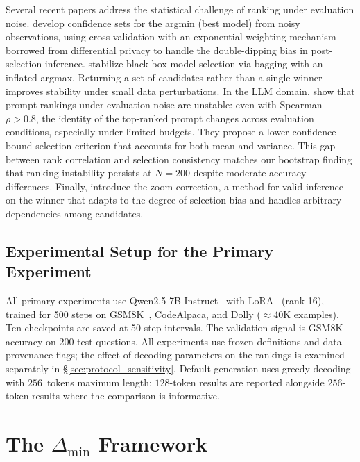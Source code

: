 \documentclass[pdflatex,sn-mathphys-ay,iicol]{sn-jnl}
\theoremstyle{thmstylethree}
\begin{document}
Several recent papers address the statistical challenge of ranking under evaluation noise. \citet{zhang2024winners} develop confidence sets for the argmin (best model) from noisy observations, using cross-validation with an exponential weighting mechanism borrowed from differential privacy to handle the double-dipping bias in post-selection inference. \citet{adrian2024stabilizing} stabilize black-box model selection via bagging with an inflated argmax. Returning a set of candidates rather than a single winner improves stability under small data perturbations. In the LLM domain, \citet{du2026stability} show that prompt rankings under evaluation noise are unstable: even with Spearman $\rho>0.8$, the identity of the top-ranked prompt changes across evaluation conditions, especially under limited budgets. They propose a lower-confidence-bound selection criterion that accounts for both mean and variance. This gap between rank correlation and selection consistency matches our bootstrap finding that ranking instability persists at $N=200$ despite moderate accuracy differences. Finally, \citet{zrnic2024flexible} introduce the zoom correction, a method for valid inference on the winner that adapts to the degree of selection bias and handles arbitrary dependencies among candidates.

\subsection{Experimental Setup for the Primary Experiment}

All primary experiments use Qwen2.5-7B-Instruct~\citep{qwen2024qwen2} with LoRA~\citep{hu2022lora} (rank 16), trained for 500 steps on GSM8K~\citep{cobbe2021gsm8k}, CodeAlpaca, and Dolly ($\approx$40K examples). Ten checkpoints are saved at 50-step intervals. The validation signal is GSM8K accuracy on 200 test questions. All experiments use frozen definitions and data provenance flags; the effect of decoding parameters on the rankings is examined separately in \S\ref{sec:protocol_sensitivity}. Default generation uses greedy decoding with $256$~tokens maximum length; $128$-token results are reported alongside $256$-token results where the comparison is informative.

\section{The $\Delta_{\min}$ Framework}\label{sec:framework}
\end{document}
